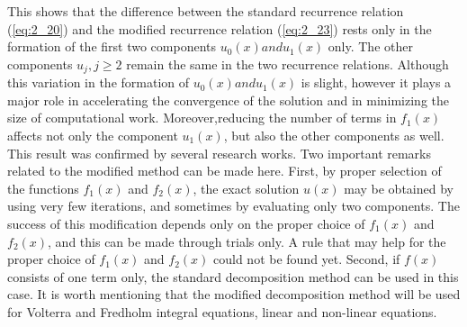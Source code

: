 \documentclass[11pt]{report}
\newcommand{\refn}[1]{(\ref{#1})}
\newcommand{\refx}[1]{\refn{eq:#1}}
\newcommand{\NI}{\noindent}
\begin{document}
	\NI This shows that the difference between the standard recurrence relation \refx{2_20} and the modified recurrence relation \refx{2_23} rests only in the formation of the first two components $u_0(x) and u_1(x)$ only. The other components $u_j, j \geq 2$ remain the same in the two recurrence relations. Although this variation in the formation of $u_0(x) and u_1(x)$ is slight, however it plays a major role in accelerating the convergence of the solution and in minimizing the size of computational work. Moreover,reducing the number of terms in $f_1(x)$ affects not only the component $u_1(x)$, but also the other components as well. This result was confirmed by several research works. Two important remarks related to the modified method can be made here. First, by proper selection of the functions $f_1(x)$ and $f_2(x)$, the exact solution $u(x)$ may be obtained by using very few iterations, and sometimes by evaluating only two components. The success of this modification depends only on the proper choice of $f_1(x)$ and $f_2(x)$, and this can be made through trials only. A rule that may help for the proper choice of $f_1(x)$ and $f_2(x)$ could not be found yet. Second, if $f(x)$ consists of one term only, the standard decomposition method can be used in this case.
	It is worth mentioning that the modified decomposition method will be used for Volterra and Fredholm integral equations, linear and non-linear equations.\\
	
\end{document}

